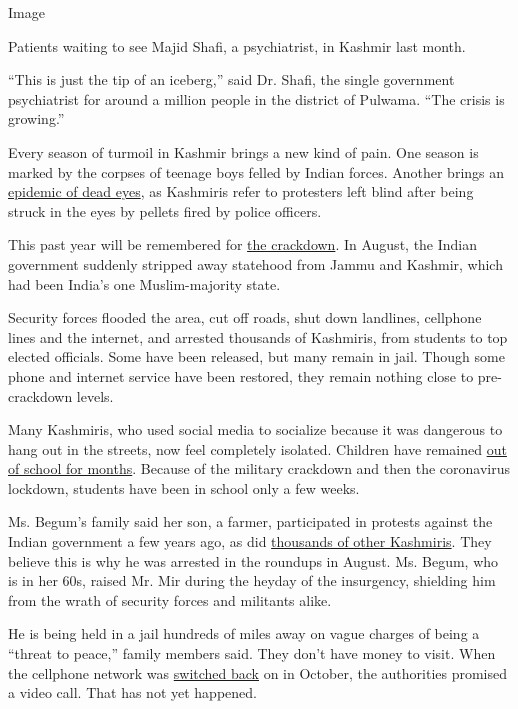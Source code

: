 Image

Patients waiting to see Majid Shafi, a psychiatrist, in Kashmir last
month.

``This is just the tip of an iceberg,'' said Dr. Shafi, the single
government psychiatrist for around a million people in the district of
Pulwama. ``The crisis is growing.''

Every season of turmoil in Kashmir brings a new kind of pain. One season
is marked by the corpses of teenage boys felled by Indian forces.
Another brings an
\href{https://www.nytimes.com/2016/08/29/world/asia/pellet-guns-used-in-kashmir-protests-cause-dead-eyes-epidemic.html}{epidemic
of dead eyes}, as Kashmiris refer to protesters left blind after being
struck in the eyes by pellets fired by police officers.

This past year will be remembered for
\href{https://www.nytimes.com/2019/09/30/world/asia/Kashmir-lockdown-photos.html}{the
crackdown}. In August, the Indian government suddenly stripped away
statehood from Jammu and Kashmir, which had been India's one
Muslim-majority state.

Security forces flooded the area, cut off roads, shut down landlines,
cellphone lines and the internet, and arrested thousands of Kashmiris,
from students to top elected officials. Some have been released, but
many remain in jail. Though some phone and internet service have been
restored, they remain nothing close to pre-crackdown levels.

Many Kashmiris, who used social media to socialize because it was
dangerous to hang out in the streets, now feel completely isolated.
Children have remained
\href{https://www.nytimes.com/2019/10/31/world/asia/kashmir-school-children.html}{out
of school for months}. Because of the military crackdown and then the
coronavirus lockdown, students have been in school only a few weeks.

Ms. Begum's family said her son, a farmer, participated in protests
against the Indian government a few years ago, as did
\href{https://www.nytimes.com/2016/07/17/world/asia/how-killing-of-prominent-separatist-set-off-turmoil-in-kashmir.html}{thousands
of other Kashmiris}. They believe this is why he was arrested in the
roundups in August. Ms. Begum, who is in her 60s, raised Mr. Mir during
the heyday of the insurgency, shielding him from the wrath of security
forces and militants alike.

He is being held in a jail hundreds of miles away on vague charges of
being a ``threat to peace,'' family members said. They don't have money
to visit. When the cellphone network was
\href{https://www.nytimes.com/2019/10/14/business/kashmir-cellphone-service-restored.html}{switched
back} on in October, the authorities promised a video call. That has not
yet happened.

